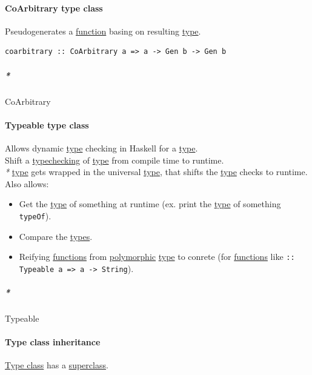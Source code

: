 \documentclass[11pt]{article}
\begin{document}
\paragraph{\label{org8725110}CoArbitrary type class}
\label{sec:orgeedebb9}
Pseudogenerates a \hyperref[orgeb5cddb]{function} basing on resulting \hyperref[org4fbaeb8]{type}.\\
\begin{verbatim}
coarbitrary :: CoArbitrary a => a -> Gen b -> Gen b
\end{verbatim}

\subparagraph{\emph{*}}
\label{sec:org0164edc}

\label{org898b0d6}CoArbitrary\\

\paragraph{\label{orgd5cc504}Typeable type class}
\label{sec:org181b951}
Allows dynamic \hyperref[org4fbaeb8]{type} checking in Haskell for a \hyperref[org4fbaeb8]{type}.\\
Shift a \hyperref[org84c913f]{typechecking} of \hyperref[org4fbaeb8]{type} from compile time to runtime.\\
\emph{*} \hyperref[org4fbaeb8]{type} gets wrapped in the universal \hyperref[org4fbaeb8]{type}, that shifts the \hyperref[org4fbaeb8]{type} checks to runtime.\\

Also allows:\\
\begin{itemize}
\item Get the \hyperref[org4fbaeb8]{type} of something at runtime (ex. print the \hyperref[org4fbaeb8]{type} of something \texttt{typeOf}).\\
\item Compare the \hyperref[org3927fd9]{types}.\\
\item Reifying \hyperref[org66c5288]{functions} from \hyperref[org84d7fee]{polymorphic} \hyperref[org4fbaeb8]{type} to conrete (for \hyperref[org66c5288]{functions} like \texttt{:: Typeable a => a -> String}).\\
\end{itemize}

\subparagraph{\emph{*}}
\label{sec:orgdad1884}

\label{org927b640}Typeable\\

\paragraph{\label{org17e4bbf}Type class inheritance}
\label{sec:org0e1f8a5}
\hyperref[orga4a5066]{Type class} has a \hyperref[org2d4bc47]{superclass}.\\
\end{document}
